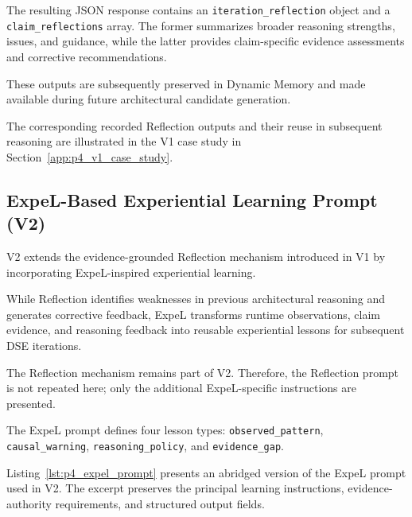 The resulting JSON response contains an
\texttt{iteration\_reflection} object and a
\texttt{claim\_reflections} array. The former
summarizes broader reasoning strengths, issues,
and guidance, while the latter provides
claim-specific evidence assessments and
corrective recommendations.

These outputs are subsequently preserved in
Dynamic Memory and made available during
future architectural candidate generation.

The corresponding recorded Reflection outputs
and their reuse in subsequent reasoning are
illustrated in the V1 case study in
Section~\ref{app:p4_v1_case_study}.



\subsection{ExpeL-Based Experiential Learning Prompt (V2)}
\label{app:p4_expel_prompt}

V2 extends the evidence-grounded Reflection mechanism
introduced in V1 by incorporating ExpeL-inspired
experiential learning.

While Reflection identifies weaknesses in previous
architectural reasoning and generates corrective
feedback, ExpeL transforms runtime observations,
claim evidence, and reasoning feedback into reusable
experiential lessons for subsequent DSE iterations.

The Reflection mechanism remains part of V2.
Therefore, the Reflection prompt is not repeated
here; only the additional ExpeL-specific instructions
are presented.

The ExpeL prompt defines four lesson types:
\texttt{observed\_pattern}, \texttt{causal\_warning},
\texttt{reasoning\_policy}, and \texttt{evidence\_gap}.

Listing~\ref{lst:p4_expel_prompt} presents an
abridged version of the ExpeL prompt used in V2.
The excerpt preserves the principal learning
instructions, evidence-authority requirements,
and structured output fields.

